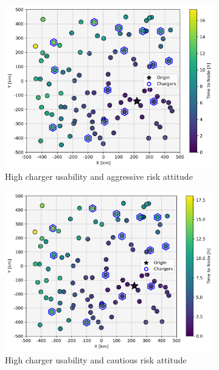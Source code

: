\documentclass[11pt]{article}
\begin{document}
\begin{figure}[H]
	\centering
	\begin{subfigure}{.4\linewidth}
		\centering\includegraphics[width = \linewidth]{figs/interactions_ha.png}
		\captionsetup{width=.8\linewidth}
		\caption{High charger usability and aggressive risk attitude}
	\end{subfigure}%
	\begin{subfigure}{.4\linewidth}
		\centering\includegraphics[width = \linewidth]{figs/interactions_hc.png}
		\captionsetup{width=.8\linewidth}
		\caption{High charger usability and cautious risk attitude}
	\end{subfigure}
	\begin{subfigure}{.4\linewidth}

\end{subfigure}
\end{figure}
\end{document}
